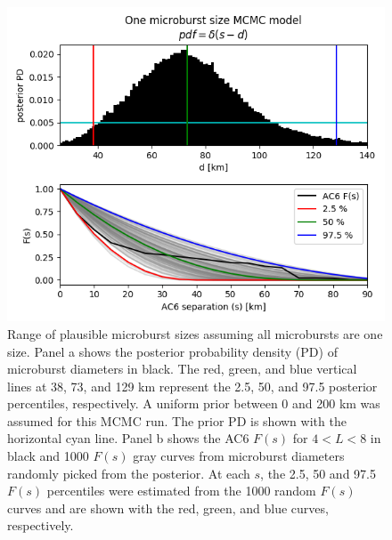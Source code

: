 \documentclass[draft]{agujournal2019}
\begin{document}
\begin{figure}
\includegraphics[width=\textwidth]{fig6.png}
\caption{Range of plausible microburst sizes assuming all microbursts are one size. Panel a shows the posterior probability density (PD) of microburst diameters in black. The red, green, and blue vertical lines at 38, 73, and 129 km represent the 2.5, 50, and 97.5 posterior percentiles, respectively. A uniform prior between 0 and 200 km was assumed for this MCMC run. The prior PD is shown with the horizontal cyan line. Panel b shows the AC6 $F(s)$ for $4 < L < 8$ in black and 1000 $F(s)$ gray curves from microburst diameters randomly picked from the posterior. At each $s$, the 2.5, 50 and 97.5 $F(s)$ percentiles were estimated from the 1000 random $F(s)$ curves and are shown with the red, green, and blue curves, respectively.} 
\label{fig6}
\end{figure}
\end{document}
